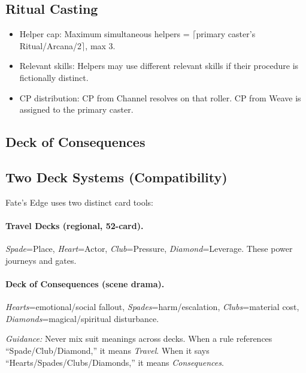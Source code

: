 \documentclass[11pt]{article}
\begin{document}
\subsection{Ritual Casting}
\begin{itemize}
    \item Helper cap: Maximum simultaneous helpers = $\lceil$primary caster's Ritual/Arcana/2$\rceil$, max 3.
    \item Relevant skills: Helpers may use different relevant skills if their procedure is fictionally distinct.
    \item CP distribution: CP from Channel resolves on that roller. CP from Weave is assigned to the primary caster.
\end{itemize}

\subsection{Deck of Consequences}

\subsection{Two Deck Systems (Compatibility)}
Fate's Edge uses two distinct card tools:

\paragraph{Travel Decks (regional, 52-card).}
\emph{Spade}=Place, \emph{Heart}=Actor, \emph{Club}=Pressure, \emph{Diamond}=Leverage. These power journeys and gates.

\paragraph{Deck of Consequences (scene drama).}
\emph{Hearts}=emotional/social fallout, \emph{Spades}=harm/escalation, \emph{Clubs}=material cost, \emph{Diamonds}=magical/spiritual disturbance.

\textit{Guidance:} Never mix suit meanings across decks. When a rule references ``Spade/Club/Diamond,'' it means \emph{Travel}. When it says ``Hearts/Spades/Clubs/Diamonds,'' it means \emph{Consequences}.
\end{document}
